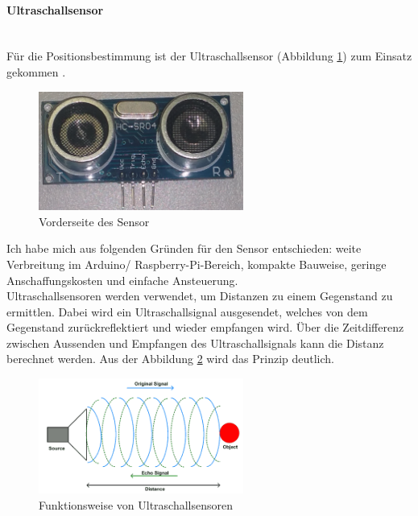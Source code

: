 \paragraph{Ultraschallsensor}\mbox{}\\
Für die Positionsbestimmung ist der Ultraschallsensor \ultraschall \platz (Abbildung \ref{img:ultraschallsensor}) zum Einsatz gekommen \cite{src_HC_SR04}. 

\begin{figure}[!ht]
        \centering
        \includegraphics[width=0.6\textwidth]{images/ultraschallsensor.png}
        \caption{Vorderseite des \ultraschall \platz Sensor}
        \label{img:ultraschallsensor}
\end{figure}

Ich habe mich aus folgenden Gründen für den \ultraschall \platz Sensor entschieden: weite Verbreitung im Arduino/ Raspberry-Pi-Bereich, kompakte Bauweise, geringe Anschaffungskosten und einfache Ansteuerung.
\\
Ultraschallsensoren werden verwendet, um Distanzen zu einem Gegenstand zu ermittlen. Dabei wird ein Ultraschallsignal ausgesendet, welches von dem Gegenstand zurückreflektiert und wieder empfangen wird. Über die Zeitdifferenz zwischen Aussenden und Empfangen des Ultraschallsignals kann die Distanz berechnet werden. Aus der Abbildung \ref{img:ultraschall_prinzip} wird das Prinzip deutlich. 

\begin{figure}[H]
        \centering
        \includegraphics[width=0.6\textwidth]{images/ultraschall_prinzip.png}
        \caption{Funktionsweise von Ultraschallsensoren}
        \label{img:ultraschall_prinzip}
\end{figure}

